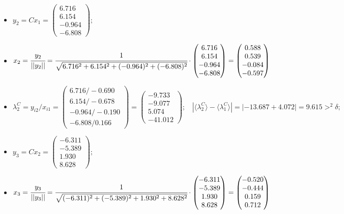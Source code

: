 \begin{itemize}
    \item
    $y_2 = Cx_1 =
    \begin{pmatrix}
         6.716\\
         6.154\\
        -0.964\\
        -6.808
    \end{pmatrix};$

    \item
    $x_2 = \cfrac{y_2}{||y_2||} = \cfrac{1}{\sqrt{6.716^2+6.154^2+(-0.964)^2+(-6.808)^2}}\cdot
    \begin{pmatrix}
         6.716\\
         6.154\\
         -0.964\\
         -6.808
    \end{pmatrix} =
    \begin{pmatrix}
        0.588\\
        0.539\\
        -0.084\\
        -0.597
    \end{pmatrix}$

    \item
    $\lambda^C_2 = y_{i2} / x_{i1} =
    \begin{pmatrix}
        6.716/-0.690\\
        6.154/-0.678\\
       -0.964/-0.190\\
       -6.808/ 0.166
    \end{pmatrix} =
    \begin{pmatrix}
        -9.733\\
        -9.077\\
         5.074\\
       -41.012
    \end{pmatrix};~~~~
    |\langle\lambda^C_2\rangle-\langle\lambda^C_1\rangle| = |-13.687+4.072| = 9.615 >^2 \delta;$



    \item
    $y_3 = Cx_2 =
    \begin{pmatrix}
       -6.311\\
       -5.389\\
        1.930\\
        8.628
    \end{pmatrix};$

    \item
    $x_3 = \cfrac{y_3}{||y_3||} = \cfrac{1}{\sqrt{(-6.311)^2+(-5.389)^2+1.930^2+8.628^2}}\cdot
    \begin{pmatrix}
        -6.311\\
        -5.389\\
        1.930\\
        8.628
    \end{pmatrix} =
    \begin{pmatrix}
        -0.520\\
        -0.444\\
        0.159\\
        0.712
    \end{pmatrix}$


\end{itemize}
